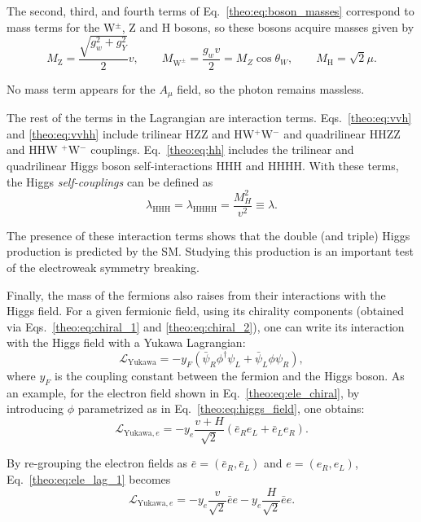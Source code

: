 \documentclass[../main.tex]{subfiles}
\begin{document}
The second, third, and fourth terms of Eq.~\eqref{theo:eq:boson_masses} correspond to mass terms for the W${}^\pm$, Z and H bosons, so these bosons acquire masses given by
\begin{equation}
M_\text{Z} = \frac{\sqrt{g_w^2 + g_Y^2}}{2}v , \qquad M_{\text{W}^\pm}= \frac{g_w v}{2} = M_Z \cos \theta_W, \qquad M_\text{H} = \sqrt{2}\mu.
\end{equation}

No mass term appears for the $A_\mu$ field, so the photon remains massless.

The rest of the terms in the Lagrangian are interaction terms. Eqs.~\eqref{theo:eq:vvh} and \eqref{theo:eq:vvhh} include trilinear HZZ and HW${}^+$W${}^-$ and quadrilinear HHZZ and HHW
${}^+$W${}^-$ couplings. Eq.~\eqref{theo:eq:hh} includes the trilinear and quadrilinear Higgs boson self-interactions HHH and HHHH. With these terms, the Higgs \textit{self-couplings} can be defined as
\begin{equation}
\lambda_{\text{HHH}} = \lambda_{\text{HHHH}} = \frac{M_H^2}{v^2} \equiv \lambda.
\end{equation}

The presence of these interaction terms shows that the double (and triple) Higgs production is predicted by the SM. Studying this production is an important test of the electroweak symmetry breaking.

Finally, the mass of the fermions also raises from their interactions with the Higgs field. For a given fermionic field, using its chirality components (obtained via Eqs.~\eqref{theo:eq:chiral_1} and \eqref{theo:eq:chiral_2}), one can write its interaction with the Higgs field with a Yukawa Lagrangian:
\begin{equation}
\mathcal{L}_{\text{Yukawa}} = -y_F(\bar{\psi}_R\phi^\dagger\psi_L + \bar{\psi}_L\phi\psi_R),
\end{equation}
where $y_F$ is the coupling constant between the fermion and the Higgs boson. As an example, for the electron field shown in Eq.~\eqref{theo:eq:ele_chiral}, by introducing $\phi$ parametrized as in Eq.~\eqref{theo:eq:higgs_field}, one obtains:
\begin{equation}
\label{theo:eq:ele_lag_1}
\mathcal{L}_{\text{Yukawa}, e} = -y_e \frac{v + H}{\sqrt{2}}(\bar{e}_R e_L + \bar{e}_L e_R).
\end{equation}

By re-grouping the electron fields as $\bar{e} = (\bar{e}_R,\bar{e}_L)$ and $e = (e_R, e_L)$, Eq.~\eqref{theo:eq:ele_lag_1} becomes
\begin{equation}
\label{theo:eq:ele_lag_2}
\mathcal{L}_{\text{Yukawa}, e} = -y_e \frac{v}{\sqrt{2}} \bar{e}e -y_e \frac{H}{\sqrt{2}} \bar{e}e.
\end{equation}
\end{document}
